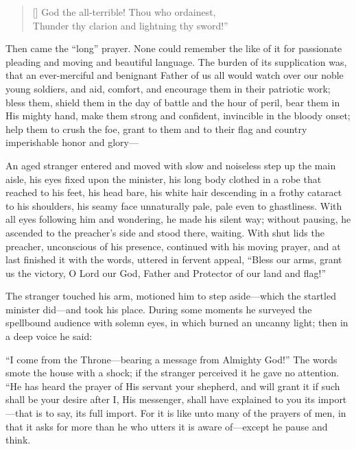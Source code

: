 \settowidth{}
\begin{verse}[\versewidth]
God the all-terrible! Thou who ordainest,\\
Thunder thy clarion and lightning thy sword!''
\end{verse}

\noindent Then came the ``long'' prayer. None could remember the like
of it for passionate pleading and moving and beautiful language. The
burden of its supplication was, that an ever-merciful and benignant
Father of us all would watch over our noble young soldiers, and aid,
comfort, and encourage them in their patriotic work; bless them,
shield them in the day of battle  and the hour of peril,
bear them in His mighty hand, make them strong and confident,
invincible in the bloody onset; help them to crush the foe, grant to
them and to their flag and country imperishable honor and glory---

An aged stranger entered and moved with slow and noiseless step up the
main aisle, his eyes fixed upon the minister, his long body clothed in
a robe that reached to his feet, his head bare, his white hair
descending in a frothy cataract to his shoulders, his seamy face
unnaturally pale, pale even to ghastliness. With all eyes following
him and wondering, he made his silent way; without pausing, he
ascended to the preacher's side and stood there, waiting. With shut
lids the preacher, unconscious of his presence, continued with his
moving prayer, and at last finished it with the words, uttered in
fervent appeal, ``Bless our arms, grant us the victory, O Lord our
God, Father and Protector of our land and flag!''

The stranger touched his arm, motioned him to step a\-side---which the
startled minister did---and took his place. During some moments he
surveyed the spellbound audience with solemn eyes, in which burned an
uncanny light; then in a deep voice he said:

``I come from the Throne---bear\-ing a message from Almighty God!''
The words smote the house with a shock; if the stranger perceived it
he gave no attention. ``He has heard the prayer of His servant your
shepherd, and will grant it if such shall be your desire after I, His
messenger, shall have explained to you its im\-port---that is to say,
its full import.  For it is like unto many of the prayers of
men, in that it asks for more than he who utters it is aware
of---except he pause and think.

